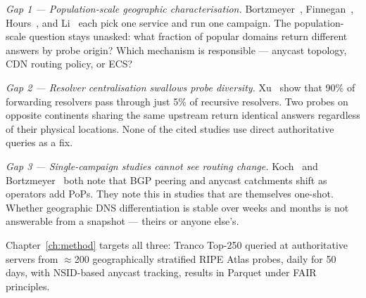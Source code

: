 \textit{Gap 1 --- Population-scale geographic characterisation.} Bortzmeyer~\cite{Bortzmeyer2013}, Finnegan~\cite{Finnegan2018}, Hours~\cite{Hours2016}, and Li~\cite{Li2025} each pick one service and run one campaign. The population-scale question stays unasked: what fraction of popular domains return different answers by probe origin? Which mechanism is responsible --- anycast topology, \ac{CDN} routing policy, or \ac{ECS}?

\textit{Gap 2 --- Resolver centralisation swallows probe diversity.} Xu~\cite{Xu2023} show that 90\% of forwarding resolvers pass through just 5\% of recursive resolvers. Two probes on opposite continents sharing the same upstream return identical answers regardless of their physical locations. None of the cited studies use direct authoritative queries as a fix.

\textit{Gap 3 --- Single-campaign studies cannot see routing change.} Koch~\cite{Koch2021} and Bortzmeyer~\cite{Bortzmeyer2013} both note that \ac{BGP} peering and anycast catchments shift as operators add \ac{PoPs}. They note this in studies that are themselves one-shot. Whether geographic \ac{DNS} differentiation is stable over weeks and months is not answerable from a snapshot --- theirs or anyone else's.

Chapter~\ref{ch:method} targets all three: Tranco Top-250 queried at authoritative servers from $\approx$200 geographically stratified RIPE Atlas probes, daily for 50 days, with \ac{NSID}-based anycast tracking, results in Parquet under \ac{FAIR} principles.
